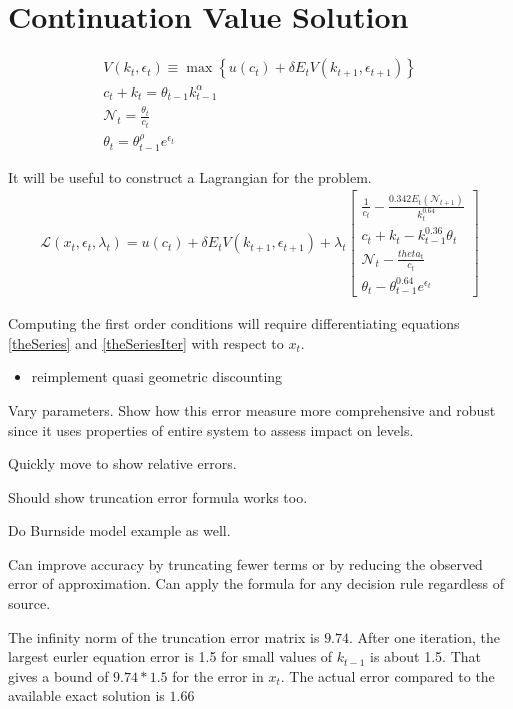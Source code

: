\documentclass[12pt]{article}
\begin{document}
\section{Continuation Value Solution}

 \begin{gather*}
 V(k_t,\epsilon_t) \equiv  \max\left \{  u(c_t) + \delta E_t V(k_{t+1},\epsilon_{t+1})\right \}\\
c_t + k_t=\theta_{t-1}k_{t-1}^\alpha \\
\mathcal{N}_t=\frac{\theta_t}{c_t}\nonumber\\
 \theta_t =\theta_{t-1}^\rho e^{\epsilon_t}\nonumber
\end{gather*}

It will be useful to construct a Lagrangian for the problem.
\begin{gather*}
  \mathcal{L}(x_t,\epsilon_t,\lambda_t)=u(c_t)+\delta E_t V(k_{t+1},\epsilon_{t+1}) + \lambda_t  \begin{bmatrix}
\frac{1}{c_t} - \frac{0.342 E_t(\mathcal{N}_{t+1})}{k_t^{0.64}}\\
c_t + k_t - k_{t-1}^{0.36}\theta_t\\
\mathcal{N}_t - \frac{theta_t}{c_t}\\
 \theta_t -\theta_{t-1}^{0.64} e^{\epsilon_t}
  \end{bmatrix}
\end{gather*}

Computing the first order conditions will require differentiating equations
\ref{theSeries} and \ref{theSeriesIter} with respect to $x_t$.


\begin{itemize}
\item reimplement quasi geometric discounting
\end{itemize}
Vary parameters.  Show how this error measure more comprehensive and robust
since it uses properties of entire system to assess impact on levels.



Quickly move to show relative errors.

Should show truncation error formula works too.

Do Burnside model example as well.

Can improve accuracy by truncating fewer terms or by reducing the observed 
error of approximation.  Can apply the formula for any decision rule regardless of source.

The infinity norm of the truncation error matrix is $9.74$.  After one iteration, the largest eurler equation error is 1.5 for small values of $k_{t-1}$ is about 1.5.  That gives a bound of $9.74*1.5$ for the error in $x_t$.  The actual error compared to the available exact solution is  $1.66$
\end{document}
